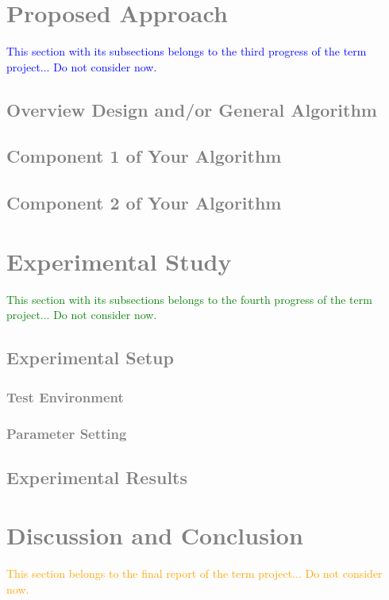 \documentclass[12pt,a4paper]{article}
\begin{document}
\section{\textcolor{gray}{Proposed Approach}}
\textcolor{blue}{This section with its subsections belongs to the third progress of the term project... Do not consider now.}
\subsection{\textcolor{gray}{Overview Design and/or General Algorithm}}
\subsection{\textcolor{gray}{Component 1 of Your Algorithm}}
\subsection{\textcolor{gray}{Component 2 of Your Algorithm}}

\section{\textcolor{gray}{Experimental Study}}
\textcolor{green}{This section with its subsections belongs to the fourth progress of the term project... Do not consider now.}
\subsection{\textcolor{gray}{Experimental Setup}}
\subsubsection{\textcolor{gray}{Test Environment}}
\subsubsection{\textcolor{gray}{Parameter Setting}}
\subsection{\textcolor{gray}{Experimental Results}}

\section{\textcolor{gray}{Discussion and Conclusion}}
\textcolor{orange}{This section belongs to the final report of the term project... Do not consider now.}
\end{document}
